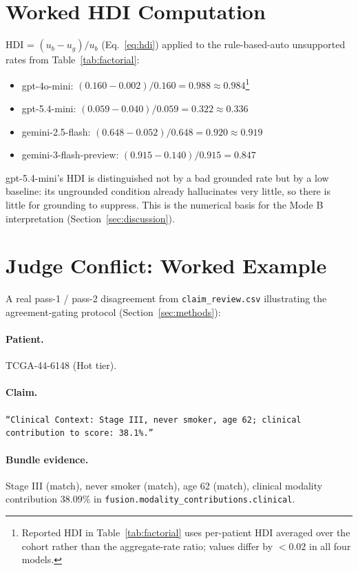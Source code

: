 \documentclass{article}
\theoremstyle{plain}
\begin{document}
\section{Worked HDI Computation}
\label{app:hdi-math}

HDI = $(u_b - u_g)/u_b$ (Eq.~\ref{eq:hdi}) applied to the rule-based-auto unsupported rates from Table~\ref{tab:factorial}:

\begin{itemize}
\item gpt-4o-mini: $(0.160 - 0.002)/0.160 = 0.988 \approx 0.984$\footnote{Reported HDI in Table~\ref{tab:factorial} uses per-patient HDI averaged over the cohort rather than the aggregate-rate ratio; values differ by $<0.02$ in all four models.}
\item gpt-5.4-mini: $(0.059 - 0.040)/0.059 = 0.322 \approx 0.336$
\item gemini-2.5-flash: $(0.648 - 0.052)/0.648 = 0.920 \approx 0.919$
\item gemini-3-flash-preview: $(0.915 - 0.140)/0.915 = 0.847$
\end{itemize}

gpt-5.4-mini's HDI is distinguished not by a bad grounded rate but by a low baseline: its ungrounded condition already hallucinates very little, so there is little for grounding to suppress. This is the numerical basis for the Mode B interpretation (Section~\ref{sec:discussion}).

\section{Judge Conflict: Worked Example}
\label{app:conflict}

A real pass-1 / pass-2 disagreement from \texttt{claim\_review.csv} illustrating the agreement-gating protocol (Section~\ref{sec:methods}):

\paragraph{Patient.} TCGA-44-6148 (Hot tier).

\paragraph{Claim.} \texttt{``Clinical Context: Stage III, never smoker, age 62; clinical contribution to score: 38.1\%.''}

\paragraph{Bundle evidence.} Stage III (match), never smoker (match), age 62 (match), clinical modality contribution 38.09\% in \texttt{fusion.modality\_contributions.clinical}.
\end{document}
